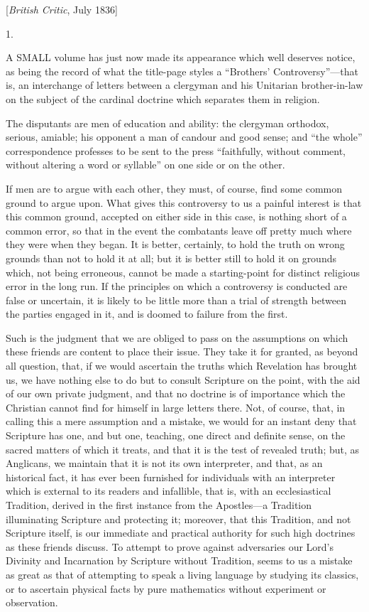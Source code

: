 
[\emph{British Critic}, July 1836]

1.

A SMALL
volume has just now made its appearance which well deserves notice, as
being the record of what the title-page styles a ``Brothers'
Controversy''—that is, an interchange of letters between a
clergyman and his Unitarian brother-in-law on the subject of the
cardinal doctrine which separates them in religion.

The disputants are men of education and ability:
the clergyman orthodox, serious, amiable; his opponent a man of
candour and good sense; and ``the whole'' correspondence professes to be
sent to the press ``faithfully, without comment, without altering a
word or syllable'' on one side or on the other.

If men are to argue with each other, they must,
of course, find some common ground to argue upon. What gives this
controversy to us a painful interest is that this common ground,
accepted on either side in this case, is nothing short of a common
error, so that in the event the combatants leave off pretty much where
they were when they began. It is better, certainly, to hold the truth
on wrong grounds than not to hold it at all; but it is better still to
hold it on grounds which, not being erroneous, cannot be made a
starting-point for distinct religious error in the long run. If the
principles on which a controversy is conducted are false or
uncertain, it is likely to be little more than a trial of strength
between the parties engaged in it, and is doomed to failure from the
first.

Such is the judgment that we are obliged to pass
on the assumptions on which these friends are content to place their
issue. They take it for granted, as beyond all question, that, if we
would ascertain the truths which Revelation has brought us, we have
nothing else to do but to consult Scripture on the point, with the aid
of our own private judgment, and that no doctrine is of importance
which the Christian cannot find for himself in large letters there.
Not, of course, that, in calling this a mere assumption and a mistake,
we would for an instant deny that Scripture has one, and but one,
teaching, one direct and definite sense, on the sacred matters of
which it treats, and that it is the test of revealed truth; but, as
Anglicans, we maintain that it is not its own interpreter, and that,
as an historical fact, it has ever been furnished for individuals with
an interpreter which is external to its readers and infallible, that
is, with an ecclesiastical Tradition, derived in the first instance
from the Apostles—a Tradition illuminating Scripture and protecting
it; moreover, that this Tradition, and not Scripture itself, is our
immediate and practical authority for such high doctrines as these
friends discuss. To attempt to prove against adversaries our Lord's
Divinity and Incarnation by Scripture without Tradition, seems to us a
mistake as great as that of attempting to speak a living language by
studying its classics, or to ascertain physical facts by pure
mathematics without experiment or observation.

